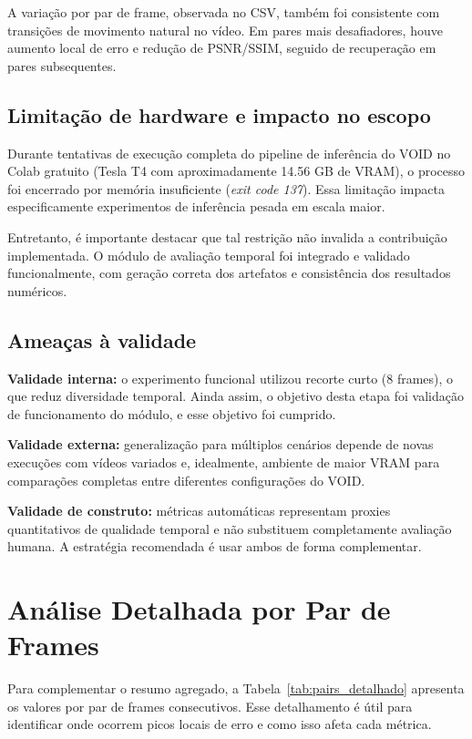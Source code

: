 \documentclass[conference]{IEEEtran}
\begin{document}
A variação por par de frame, observada no CSV, também foi consistente com transições de movimento natural no vídeo. Em pares mais desafiadores, houve aumento local de erro e redução de PSNR/SSIM, seguido de recuperação em pares subsequentes.

\subsection{Limitação de hardware e impacto no escopo}
Durante tentativas de execução completa do pipeline de inferência do VOID no Colab gratuito (Tesla T4 com aproximadamente 14.56 GB de VRAM), o processo foi encerrado por memória insuficiente (\textit{exit code 137}). Essa limitação impacta especificamente experimentos de inferência pesada em escala maior.

Entretanto, é importante destacar que tal restrição não invalida a contribuição implementada. O módulo de avaliação temporal foi integrado e validado funcionalmente, com geração correta dos artefatos e consistência dos resultados numéricos.

\subsection{Ameaças à validade}
\textbf{Validade interna:}
o experimento funcional utilizou recorte curto (8 frames), o que reduz diversidade temporal. Ainda assim, o objetivo desta etapa foi validação de funcionamento do módulo, e esse objetivo foi cumprido.

\textbf{Validade externa:}
generalização para múltiplos cenários depende de novas execuções com vídeos variados e, idealmente, ambiente de maior VRAM para comparações completas entre diferentes configurações do VOID.

\textbf{Validade de construto:}
métricas automáticas representam proxies quantitativos de qualidade temporal e não substituem completamente avaliação humana. A estratégia recomendada é usar ambos de forma complementar.

\section{Análise Detalhada por Par de Frames}
Para complementar o resumo agregado, a Tabela~\ref{tab:pairs_detalhado} apresenta os valores por par de frames consecutivos. Esse detalhamento é útil para identificar onde ocorrem picos locais de erro e como isso afeta cada métrica.
\end{document}
